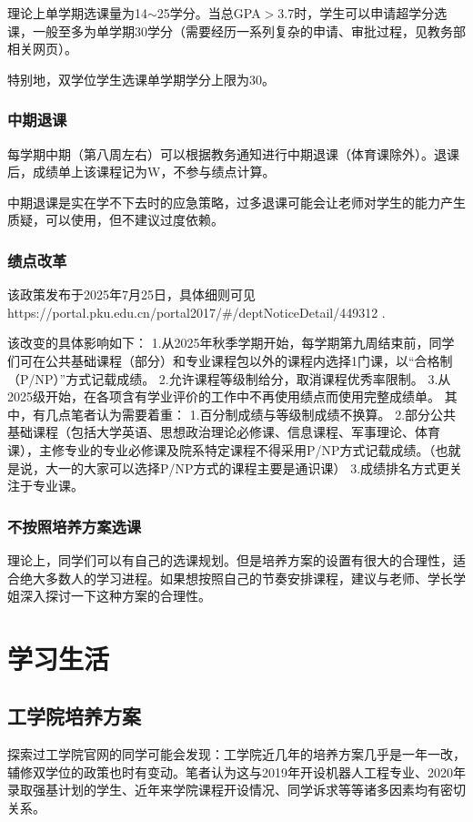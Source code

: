 \documentclass[11pt,oneside]{book}
\begin{document}
理论上单学期选课量为14$\sim$25学分。当总GPA$>$3.7时，学生可以申请超学分选课，一般至多为单学期30学分（需要经历一系列复杂的申请、审批过程，见教务部相关网页）。

特别地，双学位学生选课单学期学分上限为30。

\subsection{中期退课}
每学期中期（第八周左右）可以根据教务通知进行中期退课（体育课除外）。退课后，成绩单上该课程记为W，不参与绩点计算。

中期退课是实在学不下去时的应急策略，过多退课可能会让老师对学生的能力产生质疑，可以使用，但不建议过度依赖。

\subsection{绩点改革}
该政策发布于2025年7月25日，具体细则可见https://portal.pku.edu.cn/portal2017/#/deptNoticeDetail/449312 .

该改变的具体影响如下：
	1.从2025年秋季学期开始，每学期第九周结束前，同学们可在公共基础课程（部分）和专业课程包以外的课程内选择1门课，以“合格制（P/NP）”方式记载成绩。
 	2.允许课程等级制给分，取消课程优秀率限制。
  	3.从2025级开始，在各项含有学业评价的工作中不再使用绩点而使用完整成绩单。
其中，有几点笔者认为需要着重：
	1.百分制成绩与等级制成绩不换算。
 	2.部分公共基础课程（包括大学英语、思想政治理论必修课、信息课程、军事理论、体育课），主修专业的专业必修课及院系特定课程不得采用P/NP方式记载成绩。（也就是说，大一的大家可以选择P/NP方式的课程主要是通识课）
  	3.成绩排名方式更关注于专业课。
   
\subsection{不按照培养方案选课}
理论上，同学们可以有自己的选课规划。但是培养方案的设置有很大的合理性，适合绝大多数人的学习进程。如果想按照自己的节奏安排课程，建议与老师、学长学姐深入探讨一下这种方案的合理性。

\chapter{学习生活}
\section{工学院培养方案}
探索过工学院官网的同学可能会发现：工学院近几年的培养方案几乎是一年一改，辅修双学位的政策也时有变动。笔者认为这与2019年开设机器人工程专业、2020年录取强基计划的学生、近年来学院课程开设情况、同学诉求等等诸多因素均有密切关系。
\end{document}

